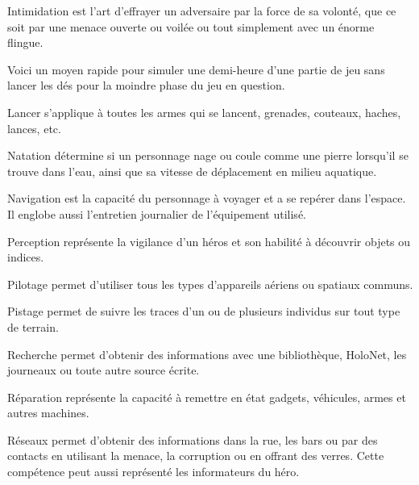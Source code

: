 \begin{description}[align=left]
    \item [Intimidation (\^Ame)]
        Intimidation est l’art d’effrayer un adversaire par la force de sa volonté, que ce soit par une menace ouverte ou voilée ou tout simplement avec un énorme flingue.

    \item [Jeu (Int)]
        Voici un moyen rapide pour simuler une demi-heure d’une partie de jeu sans lancer les dés pour la moindre phase du jeu en question.

    \item [Lancer (Agi)]
        Lancer s’applique à toutes les armes qui se lancent, grenades, couteaux, haches, lances, etc.

    \item [Natation (Agi)]
        Natation détermine si un personnage nage ou coule comme une pierre lorsqu’il se trouve dans l’eau, ainsi que sa vitesse de déplacement en milieu aquatique.

    \item [Navigation (Int)]
        Navigation est la capacité du personnage à voyager et a se repérer dans l'espace. Il englobe aussi l'entretien journalier de l'équipement utilisé.

    \item [Perception (Int)]
        Perception représente la vigilance d’un héros et son habilité à découvrir objets ou indices.

    \item [Pilotage (Agi)]
        Pilotage permet d’utiliser tous les types d’appareils aériens ou spatiaux communs.

    \item [Pistage (Int)]
        Pistage permet de suivre les traces d’un ou de plusieurs individus sur tout type de terrain.

    \item [Recherche (Int)]
        Recherche permet d’obtenir des informations avec une bibliothèque, HoloNet, les journeaux ou toute autre source écrite.

    \item [Réparation (Int)]
        Réparation représente la capacité à remettre en état gadgets, véhicules, armes et autres machines.

    \item [Réseaux (Int)]
        Réseaux permet d’obtenir des informations dans la rue, les bars ou par des contacts en utilisant la menace, la corruption ou en offrant des verres. Cette compétence peut aussi représenté les informateurs du héro.


\end{description}
